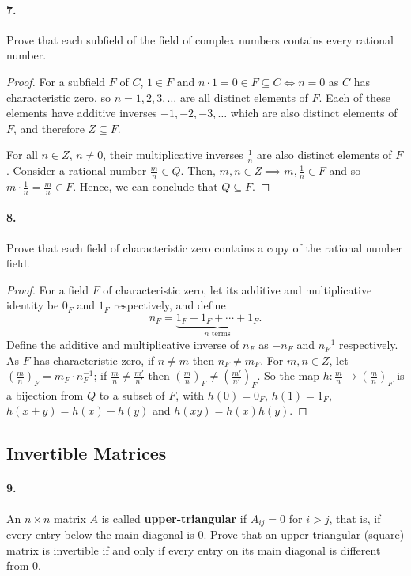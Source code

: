 \documentclass{article}
\begin{document}
\paragraph{7.} Prove that each subfield of the field of complex numbers contains
every rational number.

\begin{proof}
  For a subfield $F$ of $C$, $1 \in F$ and $n \cdot 1 = 0 \in F \subseteq C
  \iff n = 0$ as $C$ has characteristic zero, so $n = 1, 2, 3, \ldots$ are all
  distinct elements of $F$. Each of these elements have additive inverses $-1,
  -2, -3, \ldots$ which are also distinct elements of $F$, and therefore $Z
  \subseteq F$.

  For all $n \in Z$, $n \neq 0$, their multiplicative inverses $\frac{1}{n}$ are
  also distinct elements of $F$. Consider a rational number $\frac{m}{n} \in Q$.
  Then, $m, n \in Z \implies m, \frac{1}{n} \in F$ and so $m \cdot \frac{1}{n} =
  \frac{m}{n} \in F$. Hence, we can conclude that $Q \subseteq F$.
\end{proof}

\paragraph{8.} Prove that each field of characteristic zero contains a copy of
the rational number field.

\begin{proof}
  For a field $F$ of characteristic zero, let its additive and multiplicative
  identity be $0_F$ and $1_F$ respectively, and define \[
    n_F = \underbrace{1_F + 1_F + \cdots + 1_F}_{n\text{ terms}}.
  \] Define the additive and multiplicative inverse of $n_F$ as $-n_F$ and
  $n_F^{-1}$ respectively. As $F$ has characteristic zero, if $n \neq m$ then
  $n_F \neq m_F$. For $m, n \in Z$, let $\left(\frac{m}{n}\right)_F = m_F \cdot
  n_F^{-1}$; if $\frac{m}{n} \neq \frac{m'}{n'}$ then
  $\left(\frac{m}{n}\right)_F \neq \left(\frac{m'}{n'}\right)_F$. So the map
  $h: \frac{m}{n} \to \left(\frac{m}{n}\right)_F$ is a bijection from $Q$ to a
  subset of $F$, with $h(0) = 0_F$, $h(1) = 1_F$, $h(x + y) = h(x) + h(y)$ and
  $h(xy) = h(x)h(y)$.
\end{proof}

\setcounter{subsection}{5}
\subsection{Invertible Matrices}

\paragraph{9.} An $n \times n$ matrix $A$ is called \textbf{upper-triangular} if
$A_{ij} = 0$ for $i > j$, that is, if every entry below the main diagonal is 0.
Prove that an upper-triangular (square) matrix is invertible if and only if
every entry on its main diagonal is different from 0.
\end{document}

